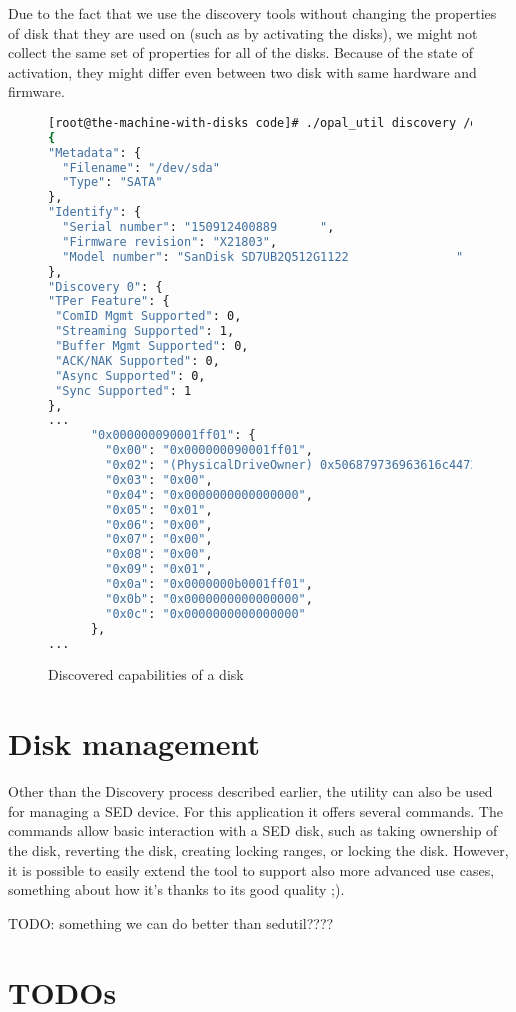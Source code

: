Due to the fact that we use the discovery tools without changing the properties of disk that they are used on (such as by activating the disks), we might not collect the same set of properties for all of the disks. Because of the state of activation, they might differ even between two disk with same hardware and firmware.

\begin{figure}
    \centering
    \begin{lstlisting}[language=Bash]
[root@the-machine-with-disks code]# ./opal_util discovery /dev/sda 2>/dev/null
{
"Metadata": {
  "Filename": "/dev/sda"
  "Type": "SATA"
},
"Identify": {
  "Serial number": "150912400889      ",
  "Firmware revision": "X21803",
  "Model number": "SanDisk SD7UB2Q512G1122               "
},
"Discovery 0": {
"TPer Feature": {
 "ComID Mgmt Supported": 0,
 "Streaming Supported": 1,
 "Buffer Mgmt Supported": 0,
 "ACK/NAK Supported": 0,
 "Async Supported": 0,
 "Sync Supported": 1
},
...
      "0x000000090001ff01": {
        "0x00": "0x000000090001ff01",
        "0x02": "(PhysicalDriveOwner) 0x506879736963616c44726976654f776e6572",
        "0x03": "0x00",
        "0x04": "0x0000000000000000",
        "0x05": "0x01",
        "0x06": "0x00",
        "0x07": "0x00",
        "0x08": "0x00",
        "0x09": "0x01",
        "0x0a": "0x0000000b0001ff01",
        "0x0b": "0x0000000000000000",
        "0x0c": "0x0000000000000000"
      },
...
    \end{lstlisting}
    \caption{Discovered capabilities of a disk}
    \label{fig:code}
\end{figure}

\section{Disk management}

Other than the Discovery process described earlier, the utility can also be used for managing a SED device. For this application it offers several commands.
The commands allow basic interaction with a SED disk, such as taking ownership of the disk, reverting the disk, creating locking ranges, or locking the disk. However, it is possible to easily extend the tool to support also more advanced use cases, something about how it's thanks to its good quality ;).

TODO: something we can do better than sedutil????

\section{TODOs}

